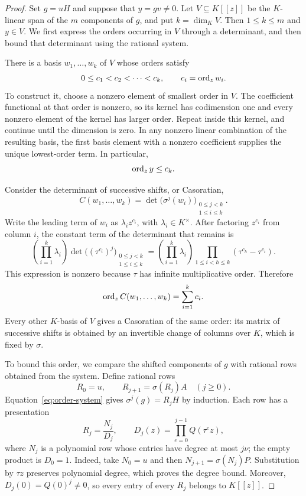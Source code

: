 \begin{proof}
Set $g=uH$ and suppose that $y=gv\neq 0$.  Let $V\subseteq K[[z]]$ be the
$K$-linear span of the $m$ components of $g$, and put $k=\dim_K V$.
Then $1\leq k\leq m$ and $y\in V$.  We first express the orders occurring
in $V$ through a determinant, and then bound that determinant using the
rational system.

There is a basis $w_1,\ldots,w_k$ of $V$ whose orders satisfy
\[
  0\leq c_1<c_2<\cdots<c_k,
  \qquad c_i=\operatorname{ord}_z w_i.
\]
To construct it, choose a nonzero element of smallest order in $V$.
The coefficient functional at that order is nonzero, so its kernel has
codimension one and every nonzero element of the kernel has larger
order.  Repeat inside this kernel, and continue until the dimension is
zero.  In any nonzero linear combination of the resulting basis, the
first basis element with a nonzero coefficient supplies the unique
lowest-order term.  In particular,
\begin{equation}\label{eq:order-largest-basis-order}
  \operatorname{ord}_z y\leq c_k.
\end{equation}

Consider the determinant of successive shifts, or Casoratian,
\[
  C(w_1,\ldots,w_k)
  =\det\bigl(\sigma^j(w_i)\bigr)_{
      \substack{0\leq j<k\\1\leq i\leq k}}.
\]
Write the leading term of $w_i$ as $\lambda_i z^{c_i}$, with
$\lambda_i\in K^\times$.  After factoring $z^{c_i}$ from column $i$, the
constant term of the determinant that remains is
\[
  \left(\prod_{i=1}^k\lambda_i\right)
  \det\bigl((\tau^{c_i})^j\bigr)_{
      \substack{0\leq j<k\\1\leq i\leq k}}
  =\left(\prod_{i=1}^k\lambda_i\right)
    \prod_{1\leq i<h\leq k}(\tau^{c_h}-\tau^{c_i}).
\]
This expression is nonzero because $\tau$ has infinite multiplicative
order.  Therefore
\begin{equation}\label{eq:casoratian-order}
  \operatorname{ord}_z C(w_1,\ldots,w_k)=\sum_{i=1}^k c_i.
\end{equation}
Every other $K$-basis of $V$ gives a Casoratian of the same order: its
matrix of successive shifts is obtained by an invertible change of
columns over $K$, which is fixed by $\sigma$.

To bound this order, we compare the shifted components of $g$ with
rational rows obtained from the system.
Define rational rows
\begin{equation}\label{eq:order-rational-rows}
  R_0=u,\qquad R_{j+1}=\sigma(R_j)A\quad(j\geq 0).
\end{equation}
Equation~\eqref{eq:order-system} gives $\sigma^j(g)=R_jH$ by induction.
Each row has a presentation
\begin{equation}\label{eq:order-row-denominators}
  R_j=\frac{N_j}{D_j},\qquad
  D_j(z)=\prod_{e=0}^{j-1}Q(\tau^e z),
\end{equation}
where $N_j$ is a polynomial row whose entries have degree at most $j\nu$;
the empty product is $D_0=1$.  Indeed, take $N_0=u$ and then
$N_{j+1}=\sigma(N_j)P$.
Substitution by $\tau z$ preserves polynomial degree, which proves the
degree bound.  Moreover, $D_j(0)=Q(0)^j\neq 0$, so every entry of every
$R_j$ belongs to $K[[z]]$.


\end{proof}
